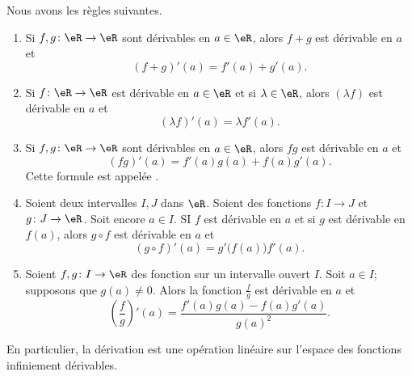 \begin{proposition}     \label{PROPooOUZOooEcYKxn}
    Nous avons les règles suivantes.
    \begin{enumerate}
        \item       \label{ITEMooTFNPooYngHnD}
            Si \( f,g\colon \eR\to \eR\) sont dérivables en \( a\in \eR\), alors \( f+g\) est dérivable en \( a\) et
            \begin{equation}
                (f+g)'(a)=f'(a)+g'(a).
            \end{equation}
        \item       \label{ITEMooIPLRooOZXqMg}
            Si \( f\colon \eR\to \eR\) est dérivable en \( a\in \eR\) et si \( \lambda\in \eR\), alors \( (\lambda f)\) est dérivable en \( a\) et 
            \begin{equation}
                (\lambda f)'(a)=\lambda f'(a).
            \end{equation}
        \item   \label{ITEMooMQERooBCqnvS}
            Si \( f,g\colon \eR\to \eR\) sont dérivables en \( a\in \eR\), alors \( fg\) est dérivable en \( a\) et
    		\begin{equation}
    			(fg)'(a)=f'(a)g(a)+f(a)g'(a).
    		\end{equation}
    		Cette formule est appelée .
        \item   \label{ITEMooLYZCooVUPTyh}
            Soient deux intervalles \( I,J\) dans \( \eR\). Soient des fonctions \( f\colon I\to J\) et \( g\colon J\to \eR\). Soit encore \( a\in I\). SI \( f\) est dérivable en \( a\) et si \( g\) est dérivable en \( f(a)\), alors \( g\circ f\) est dérivable en \( a\) et
            \begin{equation}
                (g\circ f)'(a)= g'\big( f(a) \big)f'(a).
            \end{equation}
        \item      \label{ITEMooMUNQooLiKffz}
            Soient \( f,g\colon I\to \eR\) des fonction sur un intervalle ouvert \( I\). Soit \( a\in I\); supposons que \( g(a)\neq 0\). Alors la fonction \( \frac{ f }{ g }\) est dérivable en \( a\) et
            \begin{equation}
                \left( \frac{ f }{ g } \right)'(a)=\frac{ f'(a)g(a)-f(a)g'(a) }{ g(a)^2 }.
            \end{equation}
    \end{enumerate}
    En particulier, la dérivation est une opération linéaire sur l'espace des fonctions infiniement dérivables.
\end{proposition}

